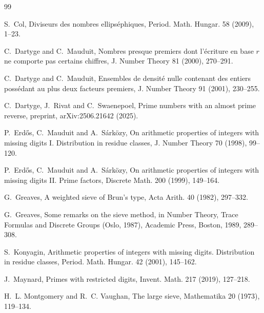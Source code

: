 \documentclass[11pt]{amsart}
\theoremstyle{definition}
\numberwithin{equation}{section}
\begin{document}
\begin{thebibliography}{99}

S.~Col, Diviseurs des nombres ellips\'ephiques, Period. Math. Hungar. 58 (2009), 1--23.

C.~Dartyge and C.~Mauduit, Nombres presque premiers dont l'\'ecriture en base $r$ ne comporte pas certains chiffres, J. Number Theory 81 (2000), 270--291.

C.~Dartyge and C.~Mauduit, Ensembles de densit\'e nulle contenant des entiers poss\'edant au plus deux facteurs premiers, J. Number Theory 91 (2001), 230--255.

C.~Dartyge, J.~Rivat and C.~Swaenepoel, Prime numbers with an almost prime reverse, preprint, arXiv:2506.21642 (2025).

P.~Erd\H{o}s, C.~Mauduit and A.~S\'ark\"ozy, On arithmetic properties of integers with missing digits I. Distribution in residue classes, J. Number Theory 70 (1998), 99--120.

P.~Erd\H{o}s, C.~Mauduit and A.~S\'ark\"ozy, On arithmetic properties of integers with missing digits II. Prime factors, Discrete Math. 200 (1999), 149--164.

G.~Greaves, A weighted sieve of Brun's type, Acta Arith. 40 (1982), 297--332.

G.~Greaves, Some remarks on the sieve method, in Number Theory, Trace Formulas and Discrete Groups (Oslo, 1987), Academic Press, Boston, 1989, 289--308.

S.~Konyagin, Arithmetic properties of integers with missing digits. Distribution in residue classes, Period. Math. Hungar. 42 (2001), 145--162.

J.~Maynard, Primes with restricted digits, Invent. Math. 217 (2019), 127--218.

H.~L. Montgomery and R.~C. Vaughan, The large sieve, Mathematika 20 (1973), 119--134.

\end{thebibliography}
\end{document}
